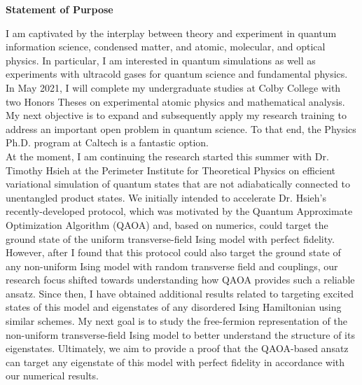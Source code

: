\documentclass[12pt]{article}
\begin{document}
\begin{center}
	\textbf{Statement of Purpose}
\end{center}
I am captivated by the interplay between theory and experiment in quantum information science, condensed matter, and atomic, molecular, and optical physics. In particular, I am interested in  quantum simulations as well as experiments with ultracold gases for quantum science and fundamental physics. In May 2021, I will complete my undergraduate studies at Colby College with two Honors Theses on experimental atomic physics and mathematical analysis. My next objective is to expand and subsequently apply my research training to address an important open problem in quantum science. To that end, the Physics Ph.D. program at Caltech is a fantastic option.  \\ 

At the moment, I am continuing the research started this summer with Dr. Timothy Hsieh at the Perimeter Institute for Theoretical Physics on efficient variational simulation of quantum states that are not adiabatically connected to unentangled product states. We initially intended to accelerate Dr. Hsieh's recently-developed protocol, which was motivated by the Quantum Approximate Optimization Algorithm (QAOA) and, based on numerics, could target the ground state of the uniform transverse-field Ising model with perfect fidelity. However, after I found that this protocol could also target the ground state of any non-uniform Ising model with random transverse field and couplings, our research focus shifted towards understanding how QAOA provides such a reliable ansatz. Since then, I have obtained additional results related to targeting excited states of this model and eigenstates of any disordered Ising Hamiltonian using similar schemes. My next goal is to study the free-fermion representation of the non-uniform transverse-field Ising model to better understand the structure of its eigenstates. Ultimately, we aim to provide a proof that the QAOA-based ansatz can target any eigenstate of this model with perfect fidelity in accordance with our numerical results.  \\
\end{document}
